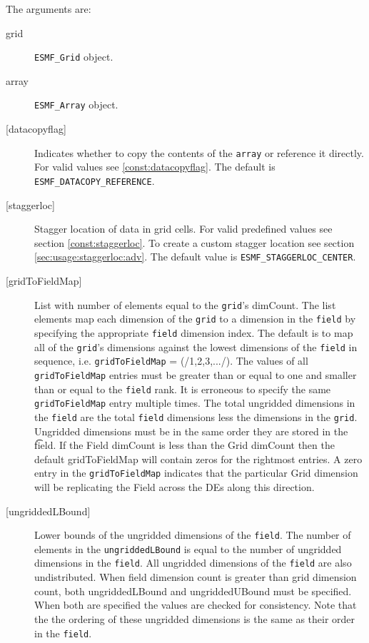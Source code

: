    The arguments are:
   \begin{description}
   \item [grid]
   {\tt ESMF\_Grid} object.
   \item [array]
   {\tt ESMF\_Array} object.
   \item [{[datacopyflag]}]
   Indicates whether to copy the contents of the {\tt array} or reference it directly.
   For valid values see \ref{const:datacopyflag}. The default is
   {\tt ESMF\_DATACOPY\_REFERENCE}.
   \item [{[staggerloc]}]
   Stagger location of data in grid cells. For valid
   predefined values see section \ref{const:staggerloc}.
   To create a custom stagger location see section
   \ref{sec:usage:staggerloc:adv}. The default
   value is {\tt ESMF\_STAGGERLOC\_CENTER}.
   \item [{[gridToFieldMap]}]
   List with number of elements equal to the
   {\tt grid}'s dimCount. The list elements map each dimension
   of the {\tt grid} to a dimension in the {\tt field} by
   specifying the appropriate {\tt field} dimension index. The default is to
   map all of the {\tt grid}'s dimensions against the lowest dimensions of
   the {\tt field} in sequence, i.e. {\tt gridToFieldMap} = (/1,2,3,.../).
   The values of all {\tt gridToFieldMap} entries must be greater than or equal
   to one and smaller than or equal to the {\tt field} rank.
   It is erroneous to specify the same {\tt gridToFieldMap} entry
   multiple times. The total ungridded dimensions in the {\tt field}
   are the total {\tt field} dimensions less
   the dimensions in
   the {\tt grid}. Ungridded dimensions must be in the same order they are
   stored in the {\t field}.
   If the Field dimCount is less than the Grid dimCount then the default
   gridToFieldMap will contain zeros for the rightmost entries. A zero
   entry in the {\tt gridToFieldMap} indicates that the particular
   Grid dimension will be replicating the Field across the DEs along
   this direction.
   \item [{[ungriddedLBound]}]
   Lower bounds of the ungridded dimensions of the {\tt field}.
   The number of elements in the {\tt ungriddedLBound} is equal to the number of ungridded
   dimensions in the {\tt field}. All ungridded dimensions of the
   {\tt field} are also undistributed. When field dimension count is
   greater than grid dimension count, both ungriddedLBound and ungriddedUBound
   must be specified. When both are specified the values are checked
   for consistency. Note that the the ordering of
   these ungridded dimensions is the same as their order in the {\tt field}.

\end{description}
